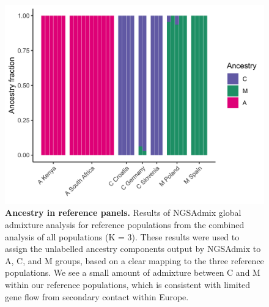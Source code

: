 \begin{figure}[p]
\includegraphics[width=\textwidth]{chapter1/figures/NGS_admix_refACM.png}
\caption{ \textbf{Ancestry in reference panels.} Results of NGSAdmix global admixture analysis for reference populations from the combined analysis of all populations (K = 3). These results were used to assign the unlabelled ancestry components output by NGSAdmix to A, C, and M groups, based on a clear mapping to the three reference populations. We see a small amount of admixture between C and M within our reference populations, which is consistent with limited gene flow from secondary contact within Europe.}

\label{ngsadmix_refACM}
\end{figure}

